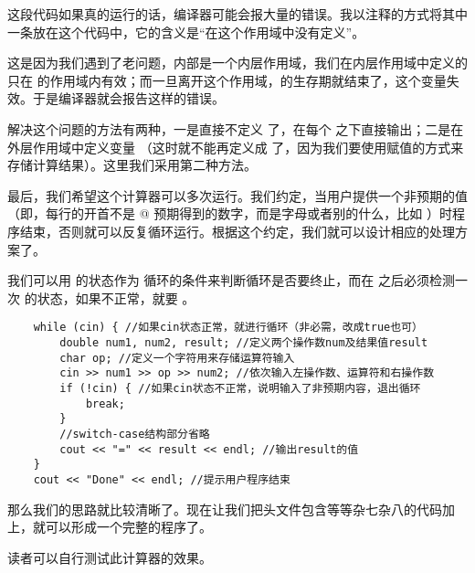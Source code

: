 这段代码如果真的运行的话，编译器可能会报大量的错误。我以注释的方式将其中一条放在这个代码中，它的含义是``\lstinline@result@ 在这个作用域中没有定义''。\par
这是因为我们遇到了老问题，\lstinline@switch@ 内部是一个内层作用域，我们在内层作用域中定义的\linebreak\lstinline@result@ 只在 \lstinline@switch@ 的作用域内有效；而一旦离开这个作用域，\lstinline@result@ 的生存期就结束了，这个变量失效。于是编译器就会报告这样的错误。\par
解决这个问题的方法有两种，一是直接不定义 \lstinline@result@ 了，在每个 \lstinline@case@ 之下直接输出；二是在外层作用域中定义变量 \lstinline@result@（这时就不能再定义成 \lstinline@const@ 了，因为我们要使用赋值的方式来存储计算结果）。这里我们采用第二种方法。\par
最后，我们希望这个计算器可以多次运行。我们约定，当用户提供一个非预期的值（即，每行的开首不是 @ 预期得到的数字，而是字母或者别的什么，比如 \lstinline@q@）时程序结束，否则就可以反复循环运行。根据这个约定，我们就可以设计相应的处理方案了。\par
我们可以用 \lstinline@cin@ 的状态作为 \lstinline@while@ 循环的条件来判断循环是否要终止，而在 \lstinline@cin@ 之后必须检测一次 \lstinline@cin@ 的状态，如果不正常，就要 \lstinline@break@。
\begin{lstlisting}
    while (cin) { //如果cin状态正常，就进行循环（非必需，改成true也可）
        double num1, num2, result; //定义两个操作数num及结果值result
        char op; //定义一个字符用来存储运算符输入
        cin >> num1 >> op >> num2; //依次输入左操作数、运算符和右操作数
        if (!cin) { //如果cin状态不正常，说明输入了非预期内容，退出循环
            break;
        }
        //switch-case结构部分省略
        cout << "=" << result << endl; //输出result的值
    }
    cout << "Done" << endl; //提示用户程序结束
\end{lstlisting}\par
那么我们的思路就比较清晰了。现在让我们把头文件包含等等杂七杂八的代码加上，就可以形成一个完整的程序了。\par
\par
读者可以自行测试此计算器的效果。\par
